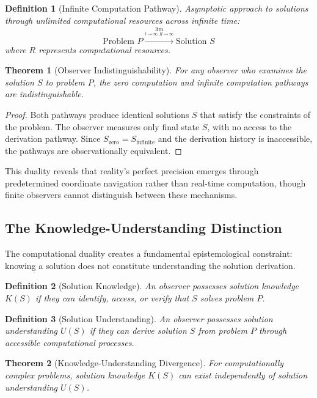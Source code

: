 \documentclass[12pt,a4paper]{article}
\newtheorem{theorem}{Theorem}
\newtheorem{definition}{Definition}
\begin{document}
\begin{definition}[Infinite Computation Pathway]
Asymptotic approach to solutions through unlimited computational resources across infinite time:
$$\text{Problem } P \xrightarrow{\lim_{t \to \infty, R \to \infty}} \text{Solution } S$$
where $R$ represents computational resources.
\end{definition}

\begin{theorem}[Observer Indistinguishability]
For any observer who examines the solution $S$ to problem $P$, the zero computation and infinite computation pathways are indistinguishable.
\end{theorem}

\begin{proof}
Both pathways produce identical solutions $S$ that satisfy the constraints of the problem. The observer measures only final state $S$, with no access to the derivation pathway. Since $S_{\text{zero}} = S_{\text{infinite}}$ and the derivation history is inaccessible, the pathways are observationally equivalent.
\end{proof}

This duality reveals that reality's perfect precision emerges through predetermined coordinate navigation rather than real-time computation, though finite observers cannot distinguish between these mechanisms.

\subsection{The Knowledge-Understanding Distinction}

The computational duality creates a fundamental epistemological constraint: knowing a solution does not constitute understanding the solution derivation.

\begin{definition}[Solution Knowledge]
An observer possesses solution knowledge $K(S)$ if they can identify, access, or verify that $S$ solves problem $P$.
\end{definition}

\begin{definition}[Solution Understanding]
An observer possesses solution understanding $U(S)$ if they can derive solution $S$ from problem $P$ through accessible computational processes.
\end{definition}

\begin{theorem}[Knowledge-Understanding Divergence]
For computationally complex problems, solution knowledge $K(S)$ can exist independently of solution understanding $U(S)$.
\end{theorem}
\end{document}
